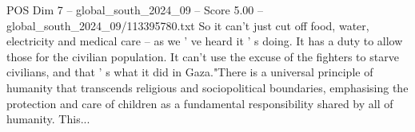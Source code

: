 \begin{textsample}{POS Dim 7 – global\_south\_2024\_09 – Score 5.00 – global\_south\_2024\_09/113395780.txt}
So it can't just cut off food, water, electricity and medical care -- as we ' ve heard it ' s doing.
It has a duty to allow those for the civilian population.
It can't use the excuse of the fighters to starve civilians, and that ' s what it did in Gaza."There is a universal principle of humanity that transcends religious and sociopolitical boundaries, emphasising the protection and care of children as a fundamental responsibility shared by all of humanity.
This...

\end{textsample}
